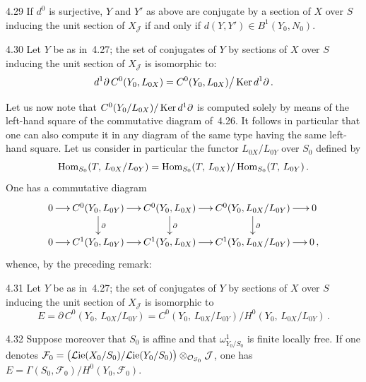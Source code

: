 \begin{corollary}{4.29}\label{III.4.29}
If \(d^{0}\) is surjective, \(Y\) and \(Y'\) as above are conjugate by a
section of \(X\) over \(S\) inducing the unit section of \(X_{\mathcal{J}}\)
if and only if \(d(Y,Y')\in B^{1}(Y_{0},N_{0})\).
\end{corollary}

\begin{corollary}{4.30}\label{III.4.30}
Let \(Y\) be as in~4.27; the set of conjugates of \(Y\) by sections of \(X\)
over \(S\) inducing the unit section of \(X_{\mathcal{J}}\) is isomorphic to:
\[
d^{1}\partial\,C^{0}(Y_{0},L_{0X})
=
C^{0}(Y_{0},L_{0X})\big/\operatorname{Ker} d^{1}\partial\,.
\]
\end{corollary}

Let us now note that \(C^{0}(Y_{0}/L_{0X})/\operatorname{Ker} d^{1}\partial\) is computed
solely by means of the left-hand square of the commutative diagram of~4.26.
It follows in particular that one can also compute it in any diagram of the
same type having the same left-hand square. Let us consider in particular the
functor \(L_{0X}/L_{0Y}\) over \(S_{0}\) defined by
\[
\operatorname{Hom}_{S_{0}}(T,\,L_{0X}/L_{0Y})
=
\operatorname{Hom}_{S_{0}}(T,\,L_{0X})/\operatorname{Hom}_{S_{0}}(T,\,L_{0Y})\,.
\]
One has a commutative diagram
\[
\xymatrix@C=1.35em@R=1.8em{
0\ar[r]
&
C^{0}(Y_{0},L_{0Y})
  \ar[r]
  \ar[d]^{\partial}
&
C^{0}(Y_{0},L_{0X})
  \ar[r]
  \ar[d]^{\partial}
&
C^{0}(Y_{0},L_{0X}/L_{0Y})
  \ar[r]
  \ar[d]^{\partial}
&
0
\\
0\ar[r]
&
C^{1}(Y_{0},L_{0Y})
  \ar[r]
&
C^{1}(Y_{0},L_{0X})
  \ar[r]
&
C^{1}(Y_{0},L_{0X}/L_{0Y})
  \ar[r]
&
0\,,
}
\]
whence, by the preceding remark:

\begin{corollary}{4.31}\label{III.4.31}
Let \(Y\) be as in~4.27; the set of conjugates of \(Y\) by sections of \(X\)
over \(S\) inducing the unit section of \(X_{\mathcal{J}}\) is isomorphic to
\[
E=\partial\,C^{0}(Y_{0},\,L_{0X}/L_{0Y})
=
C^{0}(Y_{0},\,L_{0X}/L_{0Y})
\big/
H^{0}(Y_{0},\,L_{0X}/L_{0Y})\,.
\]
\end{corollary}

\begin{corollary}{4.32}\label{III.4.32}
Suppose moreover that \(S_{0}\) is affine and that \(\omega^{1}_{Y_{0}/S_{0}}\)%
{\renewcommand{\thefootnote}{(127)}}
is finite locally free. If one denotes
\(\mathcal{F}_{0}
=\bigl(\mathcal{L}\mathrm{ie}(X_{0}/S_{0})
/\mathcal{L}\mathrm{ie}(Y_{0}/S_{0})\bigr)
\otimes_{\mathcal{O}_{S_{0}}}\mathcal{J}\),
one has \(E=\Gamma(S_{0},\mathcal{F}_{0})/H^{0}(Y_{0},\mathcal{F}_{0})\).
\end{corollary}

